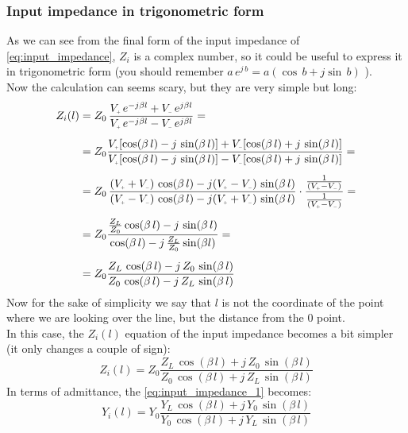 \subsubsection*{Input impedance in trigonometric form}
As we can see from the final form of the input impedance of \cref{eq:input_impedance}, $Z_i$ is a complex number, so it could be useful to express it in trigonometric form (you should remember $a\,e^{j\,b}=a(\cos\,b+j\sin\,b)$ ).\\
Now the calculation can seems scary, but they are very simple but long:
\begin{align}
    \begin{split}
      Z_i(l)&=Z_0\,\frac{V\bottomPlus \,e^{-j\beta l}+V\bottomMinus \,e^{j\beta l}}{V\bottomPlus \,e^{-j\beta l}-V\bottomMinus \,e^{j\beta l}}=\\[5pt]
      &=Z_0\frac{V\bottomPlus [\cos(\beta\, l)-j \, \sin(\beta\, l)]+V\bottomMinus [\cos(\beta\, l)+j \, \sin(\beta\, l)]}{V\bottomPlus [\cos(\beta\, l)-j \, \sin(\beta\, l)]-V\bottomMinus [\cos(\beta\, l)+j \, \sin(\beta\, l)]}=\\[5pt]
      &=Z_0\,\frac{(V\bottomPlus +V\bottomMinus )\,\cos(\beta\,l)-j(V\bottomPlus -V\bottomMinus )\,\sin(\beta\, l)}{(V\bottomPlus -V\bottomMinus )\,\cos(\beta\,l)-j(V\bottomPlus +V\bottomMinus )\,\sin(\beta\, l)}\cdot \frac{\frac{1}{(V\bottomPlus-V\bottomMinus)}}{\frac{1}{(V\bottomPlus-V\bottomMinus)}}=\\[5pt]
      &=Z_0\frac{\frac{Z_L}{Z_0}\cos(\beta\,l)-j\,\sin(\beta \,l)}{\cos(\beta\, l)-j\,\frac{Z_L}{Z_0}\sin(\beta l)}=\\[5pt]
      &=Z_0\frac{Z_L\,\cos(\beta \,l)-j\,Z_0\,\sin(\beta \, l)}{Z_0\, \cos(\beta \, l)-j\,Z_L\,\sin(\beta \, l)}
    \end{split}
\end{align}
Now for the sake of simplicity we say that $l$ is not the coordinate of the point where we are looking over the line, but the distance from the $0$ point.\\
In this case, the $Z_i(l)$ equation of the input impedance becomes a bit simpler (it only changes a couple of sign):
\begin{equation}\label{eq:input_impedance_1}
    Z_i(l)=Z_0\frac{Z_L\,\cos(\beta \,l)+j\,Z_0\,\sin(\beta \, l)}{Z_0\, \cos(\beta \, l)+j\,Z_L\,\sin(\beta \, l)}
\end{equation}
In terms of admittance, the \cref{eq:input_impedance_1} becomes:
\begin{equation}
    Y_i(l)=Y_0\frac{Y_L\,\cos(\beta \,l)+j\,Y_0\,\sin(\beta \, l)}{Y_0\, \cos(\beta \, l)+j\,Y_L\,\sin(\beta \, l)}
\end{equation}
